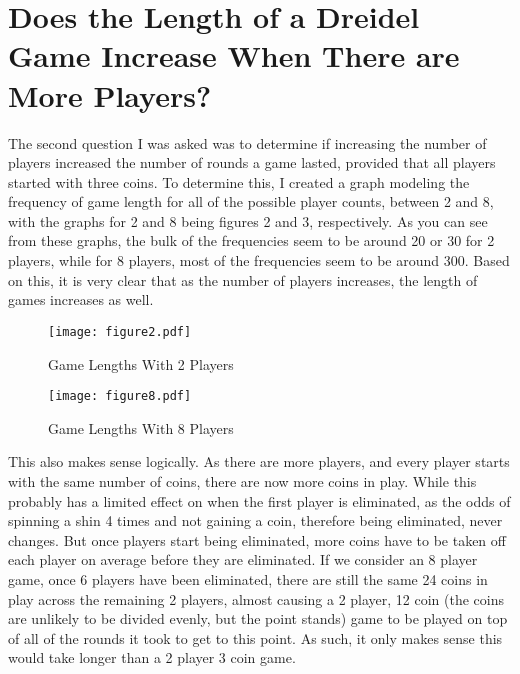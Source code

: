 \documentclass[11pt]{article}
\begin{document}
\section{Does the Length of a Dreidel Game Increase When There are More Players?}

The second question I was asked was to determine if increasing the number of players increased the number of rounds a game lasted, provided that all players started with three coins. To determine this, I created a graph modeling the frequency of game length for all of the possible player counts, between 2 and 8, with the graphs for 2 and 8 being figures 2 and 3, respectively. As you can see from these graphs, the bulk of the frequencies seem to be around 20 or 30 for 2 players, while for 8 players, most of the frequencies seem to be around 300. Based on this, it is very clear that as the number of players increases, the length of games increases as well.

\begin{figure}[tbp]
\begin{centering}
\texttt{[image: figure2.pdf]}
\caption{Game Lengths With 2 Players}
\end{centering}
\end{figure}

\begin{figure}[tbp]
\begin{centering}
\texttt{[image: figure8.pdf]}
\caption{Game Lengths With 8 Players}
\end{centering}
\end{figure}

This also makes sense logically. As there are more players, and every player starts with the same number of coins, there are now more coins in play. While this probably has a limited effect on when the first player is eliminated, as the odds of spinning a shin 4 times and not gaining a coin, therefore being eliminated, never changes. But once players start being eliminated, more coins have to be taken off each player on average before they are eliminated. If we consider an 8 player game, once 6 players have been eliminated, there are still the same 24 coins in play across the remaining 2 players, almost causing a 2 player, 12 coin (the coins are unlikely to be divided evenly, but the point stands) game to be played on top of all of the rounds it took to get to this point. As such, it only makes sense this would take longer than a 2 player 3 coin game.
\end{document}
